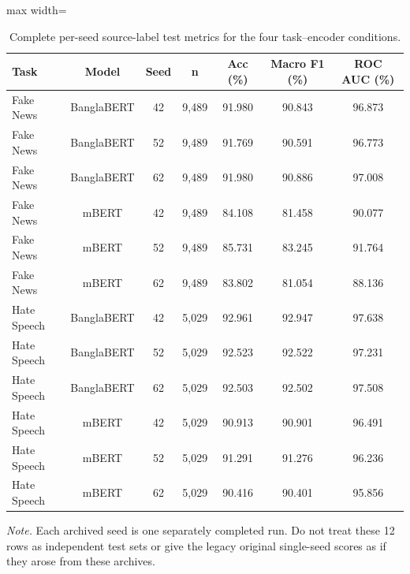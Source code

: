 \begin{table}[t]
\centering
\caption{Complete per-seed source-label test metrics for the four task--encoder conditions.}
\label{tab:allseeds}
\footnotesize
\begin{adjustbox}{max width=\linewidth}
\begin{tabular}{lcccccc}
\toprule
Task & Model & Seed & n & Acc (\%) & Macro F1 (\%) & ROC AUC (\%) \\
\midrule
Fake News & BanglaBERT & 42 & 9,489 & 91.980 & 90.843 & 96.873 \\
Fake News & BanglaBERT & 52 & 9,489 & 91.769 & 90.591 & 96.773 \\
Fake News & BanglaBERT & 62 & 9,489 & 91.980 & 90.886 & 97.008 \\
Fake News & mBERT & 42 & 9,489 & 84.108 & 81.458 & 90.077 \\
Fake News & mBERT & 52 & 9,489 & 85.731 & 83.245 & 91.764 \\
Fake News & mBERT & 62 & 9,489 & 83.802 & 81.054 & 88.136 \\
Hate Speech & BanglaBERT & 42 & 5,029 & 92.961 & 92.947 & 97.638 \\
Hate Speech & BanglaBERT & 52 & 5,029 & 92.523 & 92.522 & 97.231 \\
Hate Speech & BanglaBERT & 62 & 5,029 & 92.503 & 92.502 & 97.508 \\
Hate Speech & mBERT & 42 & 5,029 & 90.913 & 90.901 & 96.491 \\
Hate Speech & mBERT & 52 & 5,029 & 91.291 & 91.276 & 96.236 \\
Hate Speech & mBERT & 62 & 5,029 & 90.416 & 90.401 & 95.856 \\
\bottomrule
\end{tabular}
\end{adjustbox}
\par\vspace{2pt}
\begin{minipage}{\linewidth}
\scriptsize\emph{Note.} Each archived seed is one separately completed run. Do not treat these 12 rows as independent test sets or give the legacy original single-seed scores as if they arose from these archives.
\end{minipage}
\end{table}

